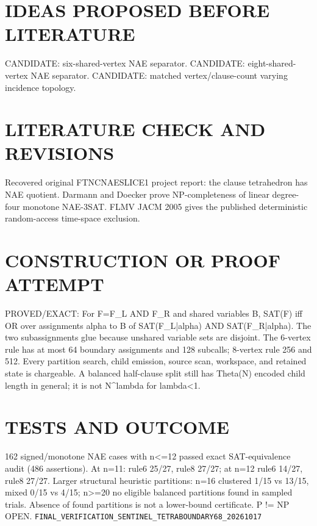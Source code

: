 \section*{IDEAS PROPOSED BEFORE LITERATURE}
CANDIDATE: six-shared-vertex NAE separator. CANDIDATE: eight-shared-vertex NAE separator. CANDIDATE: matched vertex/clause-count varying incidence topology.
\section*{LITERATURE CHECK AND REVISIONS}
Recovered original FTNCNAESLICE1 project report: the clause tetrahedron has NAE quotient. Darmann and Doecker prove NP-completeness of linear degree-four monotone NAE-3SAT. FLMV JACM 2005 gives the published deterministic random-access time-space exclusion.
\section*{CONSTRUCTION OR PROOF ATTEMPT}
PROVED/EXACT: For F=F_L AND F_R and shared variables B, SAT(F) iff OR over assignments alpha to B of SAT(F_L|alpha) AND SAT(F_R|alpha). The two subassignments glue because unshared variable sets are disjoint. The 6-vertex rule has at most 64 boundary assignments and 128 subcalls; 8-vertex rule 256 and 512. Every partition search, child emission, source scan, workspace, and retained state is chargeable. A balanced half-clause split still has Theta(N) encoded child length in general; it is not N^lambda for lambda<1.
\section*{TESTS AND OUTCOME}
162 signed/monotone NAE cases with n<=12 passed exact SAT-equivalence audit (486 assertions). At n=11: rule6 25/27, rule8 27/27; at n=12 rule6 14/27, rule8 27/27. Larger structural heuristic partitions: n=16 clustered 1/15 vs 13/15, mixed 0/15 vs 4/15; n>=20 no eligible balanced partitions found in sampled trials. Absence of found partitions is not a lower-bound certificate. P != NP OPEN.
\texttt{FINAL_VERIFICATION_SENTINEL_TETRABOUNDARY68_20261017}
